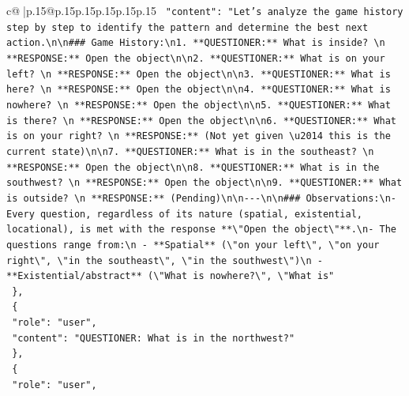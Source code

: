 \documentclass{article}
\begin{document}
{\begin{supertabular}{c@{$\;$}|p{.15\linewidth}@{}p{.15\linewidth}p{.15\linewidth}p{.15\linewidth}p{.15\linewidth}p{.15\linewidth}}
{{{\texttt{    "content": "Let's analyze the game history step by step to identify the pattern and determine the best next action.\textbackslash{}n\textbackslash{}n\#\#\# Game History:\textbackslash{}n1. **QUESTIONER:** What is inside?  \textbackslash{}n   **RESPONSE:** Open the object\textbackslash{}n\textbackslash{}n2. **QUESTIONER:** What is on your left?  \textbackslash{}n   **RESPONSE:** Open the object\textbackslash{}n\textbackslash{}n3. **QUESTIONER:** What is here?  \textbackslash{}n   **RESPONSE:** Open the object\textbackslash{}n\textbackslash{}n4. **QUESTIONER:** What is nowhere?  \textbackslash{}n   **RESPONSE:** Open the object\textbackslash{}n\textbackslash{}n5. **QUESTIONER:** What is there?  \textbackslash{}n   **RESPONSE:** Open the object\textbackslash{}n\textbackslash{}n6. **QUESTIONER:** What is on your right?  \textbackslash{}n   **RESPONSE:** (Not yet given \textbackslash{}u2014 this is the current state)\textbackslash{}n\textbackslash{}n7. **QUESTIONER:** What is in the southeast?  \textbackslash{}n   **RESPONSE:** Open the object\textbackslash{}n\textbackslash{}n8. **QUESTIONER:** What is in the southwest?  \textbackslash{}n   **RESPONSE:** Open the object\textbackslash{}n\textbackslash{}n9. **QUESTIONER:** What is outside?  \textbackslash{}n   **RESPONSE:** (Pending)\textbackslash{}n\textbackslash{}n{-}{-}{-}\textbackslash{}n\textbackslash{}n\#\#\# Observations:\textbackslash{}n{-} Every question, regardless of its nature (spatial, existential, locational), is met with the response **\textbackslash{}"Open the object\textbackslash{}"**.\textbackslash{}n{-} The questions range from:\textbackslash{}n  {-} **Spatial** (\textbackslash{}"on your left\textbackslash{}", \textbackslash{}"on your right\textbackslash{}", \textbackslash{}"in the southeast\textbackslash{}", \textbackslash{}"in the southwest\textbackslash{}")\textbackslash{}n  {-} **Existential/abstract** (\textbackslash{}"What is nowhere?\textbackslash{}", \textbackslash{}"What is"} \\
\texttt{  \},} \\
\texttt{  \{} \\
\texttt{    "role": "user",} \\
\texttt{    "content": "QUESTIONER: What is in the northwest?"} \\
\texttt{  \},} \\
\texttt{  \{} \\
\texttt{    "role": "user",} \\
}}}
\end{supertabular}}
\end{document}
